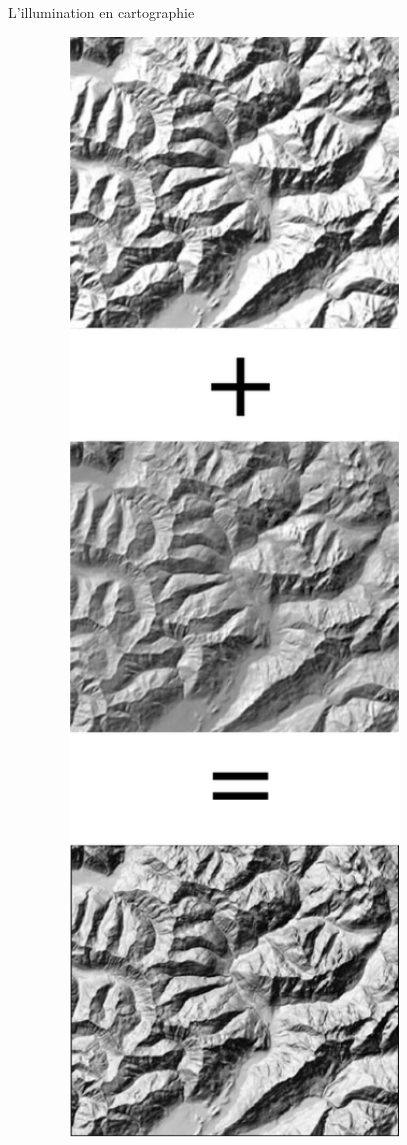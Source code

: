 \documentclass{beamer}
\begin{document}
\begin{frame}{L'illumination en cartographie}
{\begin{minipage}[t]{0.2\textwidth}
\begin{center}
\includegraphics[width=0.9\textwidth]{Etat_de_lart/tom_fusion.png}
\end{center}
\end{minipage}}


\end{frame}
\end{document}
